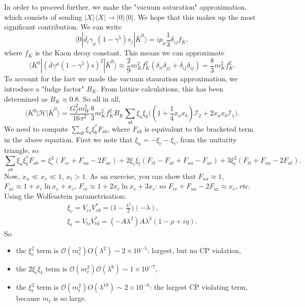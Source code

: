 In order to proceed further, we make the "vacuum saturation" approximation, which consists of sending $|X\rangle \langle X| \to |0 \rangle \langle 0|$. We hope that this makes up the most significant contribution. We can write
\begin{equation}
\langle 0 | \bar{d}_i \gamma_\mu (1-\gamma^5)s_j | \bar{K}^0 \rangle = i p_\mu \frac{1}{3} \delta_{ij} f_K,
\end{equation}
where $f_K$ is the Kaon decay constant. This means we can approximate
\begin{equation}
\langle K^0 | (\bar{d}\gamma^\mu (1-\gamma^5)s)^2| \bar{K}^0 \rangle \approx \frac{2}{9} m_K^2 f_K^2 (\delta_{ii}\delta_{jj} + \delta_{ij}\delta_{ij}) = \frac{8}{3}m_K^2 f_K^2.
\end{equation}
To account for the fact we made the vacuum stauration approximation, we introduce a "fudge factor" $B_K$. From lattice calculations, this has been determined as $B_K \approx 0.8$. So all in all,
\begin{equation}
\langle K^0 | \mathcal{H} | \overline{K}^0 \rangle = \frac{G_f^2 m_W^2}{16\pi^2} \frac{8}{3}m_K^2 f_K^2 B_K \sum_{ab} \xi_a \xi_b \bigg( (1+\frac{1}{4} x_a x_b) \mathcal{I}_2 + 2 x_a x_b \mathcal{I}_1\bigg).
\end{equation}
We need to compute $\sum_{ab}\xi_a \xi_b^* F_{ab}$, where $F_{ab}$ is equivalent to the bracketed term in the above equation. First we note that $\xi_u = -\xi_c -\xi_t$, from the unitarity triangle, so
\begin{equation}
\sum_{ab} \xi_a \xi^*_b F_{ab} = \xi_c^2(F_{cc} + F_{uu} - 2F_{uc}) + 2 \xi_c \xi_t (F_{ct} - F_{ut} + F_{uu} - F_{uc}) + 3 \xi_t^2(F_{tt} + F_{uu} - 2 F_{ut}).
\end{equation}
Now, $x_u \ll x_c \ll 1$, $x_t >1$. As an exercise, you can show that $F_{uu} \approx 1$, $F_{uc} \approx 1 + x_c \ln x_c + x_c$,  $F_{cc} \approx 1 + 2x_c \ln x_c + 3x_c$: so $F_{cc} + F_{uu} -2F_{uc} \approx x_c$, etc. Using the Wolfenstein parametrisation:
\begin{equation}
\begin{split}
\xi_c = V_{cs}V_{cd}^* = \bigg(1-\frac{\lambda^2}{2}\bigg)(-\lambda), \\
\xi_t = V_{ts}V_{td}^* = (-A\lambda^2)A\lambda^3(1-\rho+i\eta).
\end{split}
\end{equation}
So 
\begin{itemize}
\item the $\xi_c^2$ term is $\mathcal{O}(m_c^2)O(\lambda^2) \sim 2 \times 10^{-5}$: largest, but no CP violation,
\item the $2\xi_c \xi_t$ term is $\mathcal{O}(m_c^2)\mathcal{O}(\lambda^6) \sim 1 \times 10^{-7}$,
\item the $\xi_t^2$ term is $\mathcal{O}(m_t^2)O(\lambda^{10}) \sim 2 \times 10^{-6}$: the largest CP violating term, because $m_t$ is so large.
\end{itemize}
